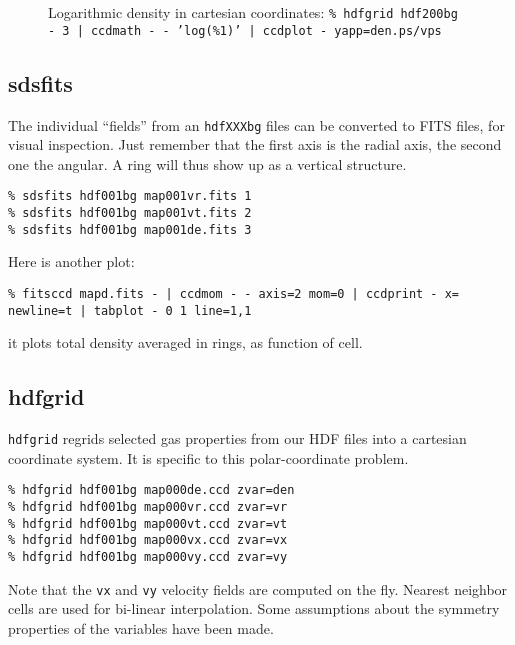 \documentclass[11pt]{article}
\begin{document}
\begin{figure}[htbp]
\epsfysize=5cm
\caption{
Logarithmic density in cartesian coordinates:\newline
  \tt \% hdfgrid hdf200bg - 3 | ccdmath - - 'log(\%1)' | ccdplot - yapp=den.ps/vps
}
\end{figure}

\subsection{sdsfits}

The individual ``fields'' from an {\tt hdfXXXbg} files can be converted to FITS files,
for visual inspection. Just remember that the first axis is the radial axis, the
second one the angular.  A ring will thus show up as a vertical structure.

\footnotesize\begin{verbatim}
% sdsfits hdf001bg map001vr.fits 1
% sdsfits hdf001bg map001vt.fits 2
% sdsfits hdf001bg map001de.fits 3
\end{verbatim}\normalsize

Here is another plot:
\footnotesize\begin{verbatim}
% fitsccd mapd.fits - | ccdmom - - axis=2 mom=0 | ccdprint - x= newline=t | tabplot - 0 1 line=1,1
\end{verbatim}\normalsize
it plots total density averaged in rings, as function of cell.

\subsection{hdfgrid}

{\tt hdfgrid}
regrids selected gas properties from our 
HDF files into a cartesian coordinate system. 
It is specific to this polar-coordinate problem.

\footnotesize\begin{verbatim}
% hdfgrid hdf001bg map000de.ccd zvar=den
% hdfgrid hdf001bg map000vr.ccd zvar=vr
% hdfgrid hdf001bg map000vt.ccd zvar=vt
% hdfgrid hdf001bg map000vx.ccd zvar=vx
% hdfgrid hdf001bg map000vy.ccd zvar=vy
\end{verbatim}\normalsize

Note that the {\tt vx} and {\tt vy} velocity fields
are computed on the fly. Nearest neighbor cells are
used for bi-linear interpolation. Some assumptions
about the symmetry properties of the variables
have been made.
\end{document}
